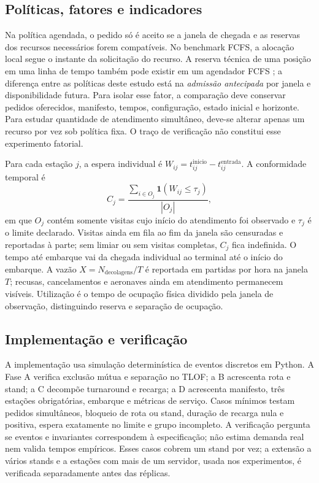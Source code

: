 \subsection{Políticas, fatores e indicadores}

Na política agendada, o pedido só é aceito se a janela de chegada e as reservas dos recursos necessários forem compatíveis. No benchmark FCFS, a alocação local segue o instante da solicitação do recurso. A reserva técnica de uma posição em uma linha de tempo também pode existir em um agendador FCFS \citep{guerreiro2020}; a diferença entre as políticas deste estudo está na \emph{admissão antecipada} por janela e disponibilidade futura. Para isolar esse fator, a comparação deve conservar pedidos oferecidos, manifesto, tempos, configuração, estado inicial e horizonte. Para estudar quantidade de atendimento simultâneo, deve-se alterar apenas um recurso por vez sob política fixa. O traço de verificação não constitui esse experimento fatorial.

Para cada estação $j$, a espera individual é $W_{ij}=t^{\mathrm{inicio}}_{ij}-t^{\mathrm{entrada}}_{ij}$. A conformidade temporal é
\begin{equation}
 C_j=\frac{\sum_{i\in O_j}\mathbf{1}(W_{ij}\leq \tau_j)}{|O_j|},
\end{equation}
em que $O_j$ contém somente visitas cujo início do atendimento foi observado e $\tau_j$ é o limite declarado. Visitas ainda em fila ao fim da janela são censuradas e reportadas à parte; sem limiar ou sem visitas completas, $C_j$ fica indefinida. O tempo até embarque vai da chegada individual ao terminal até o início do embarque. A vazão $X=N_{\mathrm{decolagens}}/T$ é reportada em partidas por hora na janela $T$; recusas, cancelamentos e aeronaves ainda em atendimento permanecem visíveis. Utilização é o tempo de ocupação física dividido pela janela de observação, distinguindo reserva e separação de ocupação.

\subsection{Implementação e verificação}

A implementação usa simulação determinística de eventos discretos em Python. A Fase A verifica exclusão mútua e separação no TLOF; a B acrescenta rota e stand; a C decompõe turnaround e recarga; a D acrescenta manifesto, três estações obrigatórias, embarque e métricas de serviço. Casos mínimos testam pedidos simultâneos, bloqueio de rota ou stand, duração de recarga nula e positiva, espera exatamente no limite e grupo incompleto. A verificação pergunta se eventos e invariantes correspondem à especificação; não estima demanda real nem valida tempos empíricos. Esses casos cobrem um stand por vez; a extensão a vários stands e a estações com mais de um servidor, usada nos experimentos, é verificada separadamente antes das réplicas.
